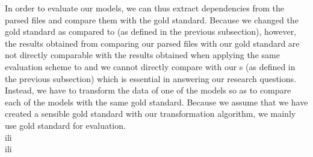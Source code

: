 \documentclass[output=paper]{LSP/langsci}
\begin{document}
{\ili{} \ili{} \ili{} \ili{} \ili{}\indent\ili{} In\ili{} order\ili{} to\ili{} evaluate\ili{} our\ili{} models\ili{},\ili{} we\ili{} can\ili{} thus\ili{} extract\ili{} dependencies\ili{} from\ili{} the\ili{} parsed\ili{} files\ili{} and\ili{} compare\ili{} them\ili{} with\ili{} the\ili{} gold\ili{} standard\ili{}.\ili{} Because\ili{} we\ili{} changed\ili{} the\ili{} gold\ili{} standard\ili{} as\ili{} compared\ili{} to\ili{} \ili{}\modelA\ili{} \ili{}(as\ili{} defined\ili{} in\ili{} the\ili{} previous\ili{} subsection\ili{})\ili{},\ili{} however\ili{},\ili{} the\ili{} results\ili{} obtained\ili{} from\ili{} comparing\ili{} our\ili{} parsed\ili{} files\ili{} with\ili{} our\ili{} gold\ili{} standard\ili{} are\ili{} not\ili{} directly\ili{} comparable\ili{} with\ili{} the\ili{} results\ili{} obtained\ili{} when\ili{} applying\ili{} the\ili{} same\ili{} evaluation\ili{} scheme\ili{} to\ili{} \ili{}\modelA\ili{} and\ili{} we\ili{} cannot\ili{} directly\ili{} compare\ili{} \ili{}\modelA\ili{} with\ili{} our\ili{} \ili{}\modelB\ili{} s\ili{} \ili{}(as\ili{} defined\ili{} in\ili{} the\ili{} previous\ili{} subsection\ili{})\ili{} which\ili{} is\ili{} essential\ili{} in\ili{} answering\ili{} our\ili{} research\ili{} questions\ili{}.\ili{} Instead\ili{},\ili{} we\ili{} have\ili{} to\ili{} transform\ili{} the\ili{} data\ili{} of\ili{} one\ili{} of\ili{} the\ili{} models\ili{} so\ili{} as\ili{} to\ili{} compare\ili{} each\ili{} of\ili{} the\ili{} models\ili{} with\ili{} the\ili{} same\ili{} gold\ili{} standard\ili{}.\ili{} Because\ili{} we\ili{} assume\ili{} that\ili{} we\ili{} have\ili{} created\ili{} a\ili{} sensible\ili{} gold\ili{} standard\ili{} with\ili{} our\ili{} transformation\ili{} algorithm\ili{},\ili{} we\ili{} mainly\ili{} use\ili{} gold\ili{} standard\ili{}\subscript{}\ili{} for\ili{} evaluation\ili{}.\ili{} \ili{}\\ili{}\\ili{}
}
\end{document}
